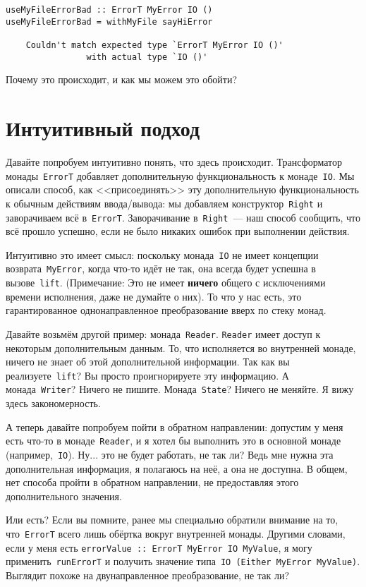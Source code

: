\begin{lstlisting}
useMyFileErrorBad :: ErrorT MyError IO ()
useMyFileErrorBad = withMyFile sayHiError

    Couldn't match expected type `ErrorT MyError IO ()'
                with actual type `IO ()'
\end{lstlisting}

Почему это происходит, и как мы можем это обойти?

\section{Интуитивный подход}
Давайте попробуем интуитивно понять, что здесь происходит. Трансформатор
монады~\lstinline'ErrorT' добавляет дополнительную функциональность к
монаде~\lstinline'IO'.  Мы описали способ, как <<присоединять>> эту
дополнительную функциональность к обычным действиям ввода/вывода: мы добавляем
конструктор~\lstinline'Right' и заворачиваем всё в~\lstinline'ErrorT'.
Заворачивание в~\lstinline'Right'~--- наш способ сообщить, что всё прошло
успешно, если не было никаких ошибок при выполнении действия.

Интуитивно это имеет смысл: поскольку монада~\lstinline'IO' не имеет концепции
возврата~\lstinline'MyError', когда что-то идёт не так, она всегда будет
успешна в вызове~\lstinline'lift'.  (Примечание: Это не имеет \textbf{ничего}
общего с исключениями времени исполнения, даже не думайте о них). То что у нас
есть, это гарантированное однонаправленное преобразование вверх по стеку монад.

Давайте возьмём другой пример: монада~\lstinline'Reader'. \lstinline'Reader'
имеет доступ к некоторым дополнительным данным. То, что исполняется во
внутренней монаде, ничего не знает об этой дополнительной информации. Так как
вы реализуете~\lstinline'lift'? Вы просто проигнорируете эту информацию. А
монада~\lstinline'Writer'? Ничего не пишите. Монада~\lstinline'State'?  Ничего
не меняйте. Я вижу здесь закономерность.

А теперь давайте попробуем пойти в обратном направлении: допустим у меня есть
что-то в монаде~\lstinline'Reader', и я хотел бы выполнить это в основной
монаде (например,~\lstinline'IO'). Ну... это не будет работать, не так ли? Ведь
мне нужна эта дополнительная информация, я полагаюсь на неё, а она не доступна.
В общем, нет способа пройти в обратном направлении, не предоставляя этого
дополнительного значения.

Или есть? Если вы помните, ранее мы специально обратили внимание на то,
что~\lstinline'ErrorT' всего лишь обёртка вокруг внутренней монады. Другими
словами, если у меня есть \lstinline'errorValue :: ErrorT MyError IO MyValue',
я могу применить~\lstinline'runErrorT' и получить значение
типа~\lstinline'IO (Either MyError MyValue)'. Выглядит похоже на
двунаправленное преобразование, не так ли?

